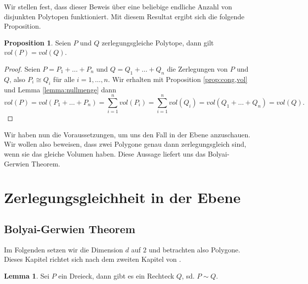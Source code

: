 \documentclass[11pt,titlepage]{article}
\theoremstyle{definition}
\newtheorem{proposition}[theorem]{Proposition}
\newtheorem{lemma}[theorem]{Lemma}
\theoremstyle{remark}
\begin{document}
	Wir stellen fest, dass dieser Beweis über eine beliebige endliche Anzahl von disjunkten 
	Polytopen funktioniert. Mit diesem Resultat ergibt sich die folgende Proposition.
	
	\begin{proposition} \label{prop:zerl,vol}
		Seien $P$ und $Q$ zerlegungsgleiche Polytope, dann gilt $vol(P)=vol(Q)$.
	\end{proposition}
	
	\begin{proof}
		Seien $P=P_1+\ldots+P_n$ und $Q=Q_1+\ldots+Q_n$ die Zerlegungen von $P$ und 
		$Q$, also $P_i\cong Q_i$ für alle $i=1,\ldots,n$. Wir erhalten mit Proposition \ref{prop:cong,vol} und Lemma \ref{lemma:nullmenge} dann 
		\[vol(P)=vol(P_1+\ldots+P_n)=\sum_{i=1}^n vol(P_i)=\sum_{i=1}^n vol(Q_i)=vol(Q_1+\ldots+Q_n)=vol(Q).\]
	\end{proof}
	
	Wir haben nun die Voraussetzungen, um uns den Fall in der Ebene 
	anzuschauen. Wir wollen also beweisen, dass zwei Polygone genau 
	dann zerlegungsgleich sind, wenn sie das gleiche Volumen haben. 
	Diese Aussage liefert uns das Bolyai-Gerwien Theorem.

	\newpage
	
	\section{Zerlegungsgleichheit in der Ebene}
	
	\subsection{Bolyai-Gerwien Theorem}
	
	Im Folgenden setzen wir die Dimension $d$ auf $2$ und betrachten also Polygone. 
	Dieses Kapitel richtet sich nach dem zweiten Kapitel von \cite{Boltianskii}.
	
	\begin{lemma}
		Sei $P$ ein Dreieck, dann gibt es ein Rechteck $Q$, sd. $P\sim Q$. \label{lemma:dreieck,rechteck}
	\end{lemma}
	
\end{document}
